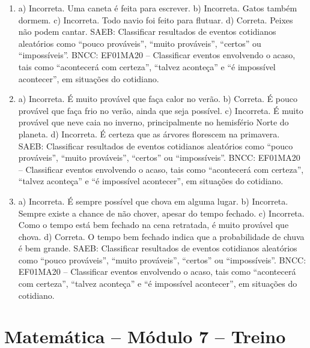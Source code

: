 \begin{enumerate}
\item
a) Incorreta. Uma caneta é feita para escrever.
b) Incorreta. Gatos também dormem.
c) Incorreta. Todo navio foi feito para flutuar.
d) Correta. Peixes não podem cantar.
SAEB: Classificar resultados de eventos cotidianos aleatórios como
``pouco prováveis'', ``muito prováveis'', ``certos'' ou ``impossíveis''.
BNCC: EF01MA20 -- Classificar eventos envolvendo o acaso, tais como
``acontecerá com certeza'', ``talvez aconteça'' e ``é impossível
acontecer'', em situações do cotidiano.

\item
a) Incorreta. É muito provável que faça calor no verão.
b) Correta. É pouco provável que faça frio no verão, ainda que seja
possível.
c) Incorreta. É muito provável que neve caia no inverno, principalmente
no hemisfério Norte do planeta.
d) Incorreta. É certeza que as árvores florescem na primavera.
SAEB: Classificar resultados de eventos cotidianos aleatórios como
``pouco prováveis'', ``muito prováveis'', ``certos'' ou ``impossíveis''.
BNCC: EF01MA20 -- Classificar eventos envolvendo o acaso, tais como
``acontecerá com certeza'', ``talvez aconteça'' e ``é impossível
acontecer'', em situações do cotidiano.

\item
a) Incorreta. É sempre possível que chova em alguma lugar.
b) Incorreta. Sempre existe a chance de não chover, apesar do tempo fechado.
c) Incorreta. Como o tempo está bem fechado na cena retratada, é muito provável que chova.
d) Correta. O tempo bem fechado indica que a probabilidade de chuva é bem grande.
SAEB: Classificar
resultados de eventos cotidianos aleatórios como ``pouco prováveis'',
``muito prováveis'', ``certos'' ou ``impossíveis''.
BNCC: EF01MA20 -- Classificar eventos envolvendo o acaso, tais como
``acontecerá com certeza'', ``talvez aconteça'' e ``é impossível
acontecer'', em situações do cotidiano.
\end{enumerate}

\section*{Matemática – Módulo 7 – Treino}

